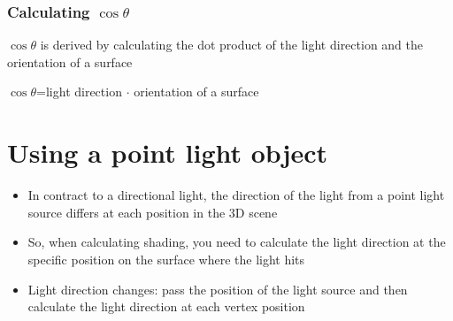 \documentclass{article}[18pt]
\begin{document}
\subsubsection{Calculating $\cos\theta$}
$\cos\theta$ is derived by calculating the dot product of the light direction and the orientation of a surface

$\cos\theta$=light direction $\cdot$ orientation of a surface
\section{Using a point light object}
\begin{itemize}
	\item In contract to a directional light, the direction of the light from a point light source differs at each position in the 3D scene
	\item So, when calculating shading, you need to calculate the light direction at the specific position on the surface where the light hits
	\item Light direction changes: pass the position of the light source and then calculate the light direction at each vertex position
\end{itemize}
\end{document}
